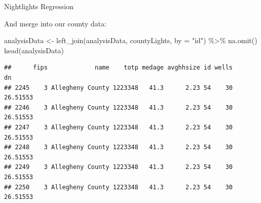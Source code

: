 \documentclass[
  ignorenonframetext,
]{beamer}
\newenvironment{Shaded}{\begin{snugshade}}{\end{snugshade}}
\newcommand{\AttributeTok}[1]{\textcolor[rgb]{0.77,0.63,0.00}{#1}}
\newcommand{\FunctionTok}[1]{\textcolor[rgb]{0.00,0.00,0.00}{#1}}
\newcommand{\NormalTok}[1]{#1}
\newcommand{\OtherTok}[1]{\textcolor[rgb]{0.56,0.35,0.01}{#1}}
\newcommand{\SpecialCharTok}[1]{\textcolor[rgb]{0.00,0.00,0.00}{#1}}
\newcommand{\StringTok}[1]{\textcolor[rgb]{0.31,0.60,0.02}{#1}}
\begin{document}
\begin{frame}[fragile]{Nightlights Regression}
\protect\hypertarget{nightlights-regression-1}{}
\normalsize

And merge into our county data: \tiny

\begin{Shaded}
\begin{Highlighting}[]
\NormalTok{analysisData }\OtherTok{\textless{}{-}} \FunctionTok{left\_join}\NormalTok{(analysisData, countyLights, }\AttributeTok{by =} \StringTok{"id"}\NormalTok{) }\SpecialCharTok{\%\textgreater{}\%}
        \FunctionTok{na.omit}\NormalTok{()}
\FunctionTok{head}\NormalTok{(analysisData)}
\end{Highlighting}
\end{Shaded}

\begin{verbatim}
##      fips             name    totp medage avghhsize id wells       dn
## 2245    3 Allegheny County 1223348   41.3      2.23 54    30 26.51553
## 2246    3 Allegheny County 1223348   41.3      2.23 54    30 26.51553
## 2247    3 Allegheny County 1223348   41.3      2.23 54    30 26.51553
## 2248    3 Allegheny County 1223348   41.3      2.23 54    30 26.51553
## 2249    3 Allegheny County 1223348   41.3      2.23 54    30 26.51553
## 2250    3 Allegheny County 1223348   41.3      2.23 54    30 26.51553
\end{verbatim}
\end{frame}
\end{document}
